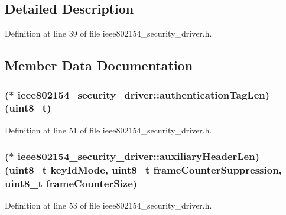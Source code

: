 \subsection{Detailed Description}


Definition at line 39 of file ieee802154\+\_\+security\+\_\+driver.\+h.



\subsection{Member Data Documentation}
\subsubsection[{\texorpdfstring{authentication\+Tag\+Len}{authenticationTagLen}}]{($\ast$  ieee802154\+\_\+security\+\_\+driver\+::authentication\+Tag\+Len) ({\bf uint8\+\_\+t})}\hypertarget{structieee802154__security__driver_a3ef1593e809f0bed98a974192143b23d}{}\label{structieee802154__security__driver_a3ef1593e809f0bed98a974192143b23d}


Definition at line 51 of file ieee802154\+\_\+security\+\_\+driver.\+h.

\subsubsection[{\texorpdfstring{auxiliary\+Header\+Len}{auxiliaryHeaderLen}}]{($\ast$  ieee802154\+\_\+security\+\_\+driver\+::auxiliary\+Header\+Len) ({\bf uint8\+\_\+t} key\+Id\+Mode, {\bf uint8\+\_\+t} frame\+Counter\+Suppression, {\bf uint8\+\_\+t} frame\+Counter\+Size)}\hypertarget{structieee802154__security__driver_a0409cde0e8565436690f8346f94dac93}{}\label{structieee802154__security__driver_a0409cde0e8565436690f8346f94dac93}


Definition at line 53 of file ieee802154\+\_\+security\+\_\+driver.\+h.

